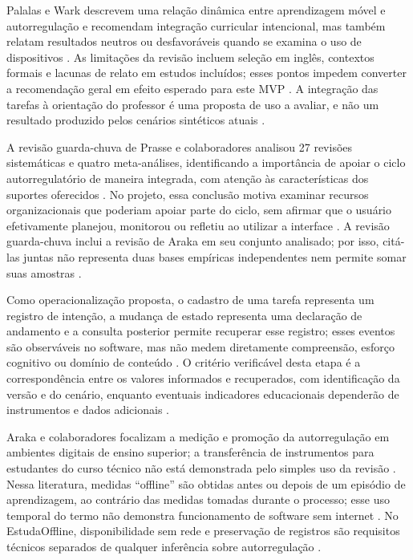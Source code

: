 Palalas e Wark descrevem uma relação dinâmica entre aprendizagem móvel e autorregulação e recomendam integração curricular intencional, mas também relatam resultados neutros ou desfavoráveis quando se examina o uso de dispositivos \citep{education_palalas2020}.
As limitações da revisão incluem seleção em inglês, contextos formais e lacunas de relato em estudos incluídos; esses pontos impedem converter a recomendação geral em efeito esperado para este MVP \citep{education_palalas2020}.
A integração das tarefas à orientação do professor é uma proposta de uso a avaliar, e não um resultado produzido pelos cenários sintéticos atuais .

A revisão guarda-chuva de Prasse e colaboradores analisou 27 revisões sistemáticas e quatro meta-análises, identificando a importância de apoiar o ciclo autorregulatório de maneira integrada, com atenção às características dos suportes oferecidos \citep{education_prasse2024}.
No projeto, essa conclusão motiva examinar recursos organizacionais que poderiam apoiar parte do ciclo, sem afirmar que o usuário efetivamente planejou, monitorou ou refletiu ao utilizar a interface \citep{education_prasse2024}.
A revisão guarda-chuva inclui a revisão de Araka em seu conjunto analisado; por isso, citá-las juntas não representa duas bases empíricas independentes nem permite somar suas amostras \citep{education_prasse2024}.

Como operacionalização proposta, o cadastro de uma tarefa representa um registro de intenção, a mudança de estado representa uma declaração de andamento e a consulta posterior permite recuperar esse registro; esses eventos são observáveis no software, mas não medem diretamente compreensão, esforço cognitivo ou domínio de conteúdo \citep{education_araka2020}.
O critério verificável desta etapa é a correspondência entre os valores informados e recuperados, com identificação da versão e do cenário, enquanto eventuais indicadores educacionais dependerão de instrumentos e dados adicionais \citep{education_araka2020,eng11}.

Araka e colaboradores focalizam a medição e promoção da autorregulação em ambientes digitais de ensino superior; a transferência de instrumentos para estudantes do curso técnico não está demonstrada pelo simples uso da revisão \citep{education_araka2020}.
Nessa literatura, medidas ``offline'' são obtidas antes ou depois de um episódio de aprendizagem, ao contrário das medidas tomadas durante o processo; esse uso temporal do termo não demonstra funcionamento de software sem internet \citep{education_araka2020}.
No EstudaOffline, disponibilidade sem rede e preservação de registros são requisitos técnicos separados de qualquer inferência sobre autorregulação \citep{sw}.



